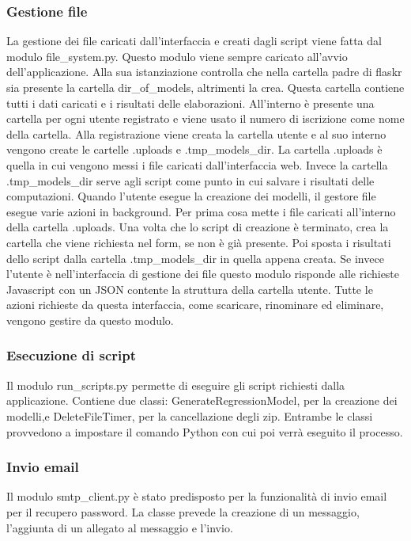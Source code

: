 \subsubsection{Gestione file}
\label{secsubsub:flask-creazione-moduli-file}
La gestione dei file caricati dall'interfaccia e creati dagli script viene fatta dal modulo file\_system.py.
Questo modulo viene sempre caricato all'avvio dell'applicazione.
Alla sua istanziazione controlla che nella cartella padre di flaskr sia presente la cartella dir\_of\_models,
altrimenti la crea.
Questa cartella contiene tutti i dati caricati e i risultati delle elaborazioni.
All'interno è presente una cartella per ogni utente registrato 
e viene usato il numero di iscrizione come nome della cartella.
Alla registrazione viene creata la cartella utente e al suo interno vengono create le cartelle .uploads e .tmp\_models\_dir.
La cartella .uploads è quella in cui vengono messi i file caricati dall'interfaccia web.
Invece la cartella .tmp\_models\_dir serve agli script come punto in cui salvare i risultati delle computazioni.
Quando l'utente esegue la creazione dei modelli, il gestore file esegue varie azioni in background.
Per prima cosa mette i file caricati all'interno della cartella .uploads.
Una volta che lo script di creazione è terminato, crea la cartella che viene richiesta nel form, se non è già presente.
Poi sposta i risultati dello script dalla cartella .tmp\_models\_dir in quella appena creata.
Se invece l'utente è nell'interfaccia di gestione dei file 
questo modulo risponde alle richieste Javascript con un JSON contente la struttura della cartella utente.
Tutte le azioni richieste da questa interfaccia, come scaricare, rinominare ed eliminare, vengono gestire da questo modulo.


\subsubsection{Esecuzione di script}
\label{secsubsub:flask-creazione-moduli-script}
Il modulo run\_scripts.py permette di eseguire gli script richiesti dalla applicazione.
Contiene due classi: GenerateRegressionModel, per la creazione dei modelli,e DeleteFileTimer, per la cancellazione degli zip.
Entrambe le classi provvedono a impostare il comando Python con cui poi verrà eseguito il processo.

\subsubsection{Invio email}
\label{secsubsub:flask-creazione-moduli-email}
Il modulo smtp\_client.py è stato predisposto per la funzionalità di invio email per il recupero password.
La classe prevede la creazione di un messaggio, l'aggiunta di un allegato al messaggio e l'invio.


